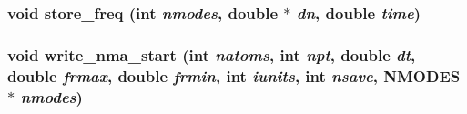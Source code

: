 \subsubsection{\setlength{\rightskip}{0pt plus 5cm}void store\_\-freq (int {\em nmodes}, double $\ast$ {\em dn}, double {\em time})}\label{nmaout_8c_4e9a55f263659971dfbb62bec5527f80}


\subsubsection{\setlength{\rightskip}{0pt plus 5cm}void write\_\-nma\_\-start (int {\em natoms}, int {\em npt}, double {\em dt}, double {\em frmax}, double {\em frmin}, int {\em iunits}, int {\em nsave}, {\bf NMODES} $\ast$ {\em nmodes})}\label{nmaout_8c_b291d317c07e1471b4359902f59f35eb}


